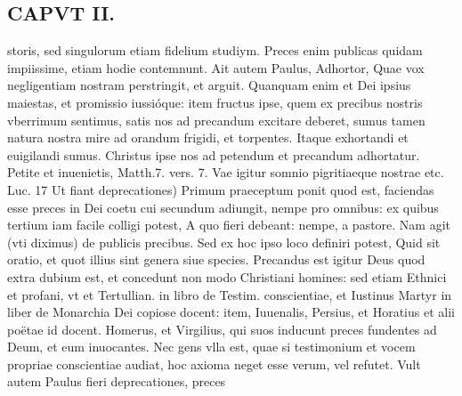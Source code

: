 \documentclass{article}
\begin{document}
\begin{pages}
\section*{CAPVT II. }
\marginpar{[ p.4I ]}storis, sed singulorum etiam fidelium studiym. Preces enim publicas quidam impiissime, etiam hodie contemnunt. \pstart Ait autem Paulus, Adhortor, Quae vox negligentiam nostram perstringit, et arguit. Quanquam enim et Dei ipsius maiestas, et promissio iussióque: item fructus ipse, quem ex precibus nostris vberrimum sentimus, satis nos ad precandum excitare deberet, sumus tamen natura nostra mire ad orandum frigidi, et torpentes. Itaque  exhortandi et euigilandi sumus. Christus ipse nos ad petendum et precandum adhortatur. Petite et inuenietis, Matth.7. vers. 7. Vae igitur somnio pigritiaeque nostrae etc. Luc. 17  \pend\pstart Ut fiant deprecationes) Primum praeceptum ponit quod est, faciendas esse preces in Dei coetu cui secundum adiungit, nempe pro omnibus: ex quibus tertium iam facile colligi potest, A quo fieri debeant: nempe, a pastore. Nam agit (vti diximus) de publicis precibus. Sed ex hoc ipso loco definiri potest, Quid sit oratio, et quot illius sint genera siue species. Precandus est igitur Deus quod extra dubium est, et concedunt non modo Christiani homines: sed etiam Ethnici et profani, vt et Tertullian. in libro de Testim. conscientiae, et Iustinus Martyr in liber  de Monarchia Dei copiose docent: item, Iuuenalis, Persius, et Horatius et alii poëtae id docent. Homerus, et Virgilius, qui suos inducunt preces fundentes ad Deum, et eum inuocantes. Nec gens vlla est, quae si testimonium et vocem propriae conscientiae audiat, hoc axioma neget esse verum, vel refutet.  \pend\pstart Vult autem Paulus fieri deprecationes, preces  \pend

\end{pages}
\end{document}
